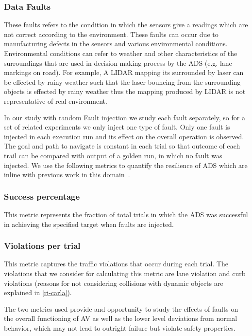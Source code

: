 \subsubsection{Data Faults} These faults refers to the condition in which the sensors give a readings which are not correct according to the environment. These faults can occur due to manufacturing defects in the sensors and various environmental conditions. Environmental conditions can refer to weather and other characteristics of the surroundings that are used in decision making process by the ADS (e.g. lane markings on road). For example, A LIDAR mapping its surrounded by laser can be effected by rainy weather such that the laser bouncing from the surrounding objects is effected by rainy weather thus the mapping produced by LIDAR is not representative of real environment.

In our study with random Fault injection we study each fault separately, so for a set of related experiments we only inject one type of fault. Only one fault is injected in each execution run and its effect on the overall operation is observed. The goal and path to navigate is constant in each trial so that outcome of each trail can be compared with output of a golden run, in which no fault was injected. We use the following metrics to quantify the resilience of ADS which are inline with previous work in this domain~\cite{avfi}.
\setcounter{subsubsection}{0}

\subsubsection{Success percentage} This metric represents the fraction of total trials in which the ADS was successful in achieving the specified target when faults are injected.


\subsubsection{Violations per trial} This metric captures the traffic violations that occur during each trial. The violations that we consider for calculating this metric are lane violation and curb violations (reasons for not considering collisions with dynamic objects are explained in \ref{ri-carla}). 

The two metrics used provide and opportunity to study the effects of faults on the overall functioning of AV as well as the lower level deviations from normal behavior, which may not lead to outright failure but violate safety properties.
